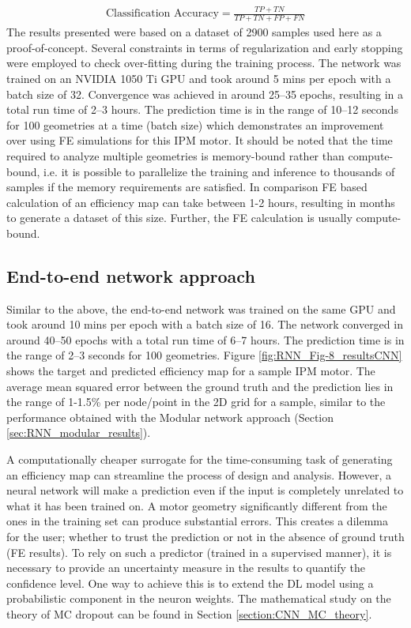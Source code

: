 \begin{align}
    \text{Classification Accuracy} = \frac{TP + TN}{TP + TN + FP + FN} \label{eqn:RNN_CA}
\end{align}
The results presented were based on a dataset of 2900 samples used here as a proof-of-concept. Several constraints in terms of regularization and early stopping \parencite{caruana2001overfitting} were employed to check over-fitting during the training process. The network was trained on an NVIDIA 1050 Ti GPU and took around 5 mins per epoch with a batch size of 32. Convergence was achieved in around 25–35 epochs, resulting in a total run time of 2–3 hours. The prediction time is in the range of 10–12 seconds for 100 geometries at a time (batch size) which demonstrates an improvement over using FE simulations for this IPM motor. It should be noted that the time required to analyze multiple geometries is memory-bound rather than compute-bound, i.e. it is possible to parallelize the training and inference to thousands of samples if the memory requirements are satisfied. In comparison FE based calculation of an efficiency map can take between 1-2 hours, resulting in months to generate a dataset of this size. Further, the FE calculation is usually compute-bound. 

\subsection{End-to-end network approach}

Similar to the above, the end-to-end network was trained on the same GPU and took around 10 mins per epoch with a batch size of 16. The network converged in around 40–50 epochs with a total run time of 6–7 hours. The prediction time is in the range of 2–3 seconds for 100 geometries. Figure \ref{fig:RNN_Fig-8_resultsCNN} shows the target and predicted efficiency map for a sample IPM motor. The average mean squared error between the ground truth and the prediction lies in the range of 1-1.5\% per node/point in the 2D grid for a sample, similar to the performance obtained with the Modular network approach (Section \ref{sec:RNN_modular_results}).

A computationally cheaper surrogate for the time-consuming task of generating an efficiency map can streamline the process of design and analysis. However, a neural network will make a prediction even if the input is completely unrelated to what it has been trained on. A motor geometry significantly different from the ones in the training set can produce substantial errors. This creates a dilemma for the user; whether to trust the prediction or not in the absence of ground truth (FE results). To rely on such a predictor (trained in a supervised manner), it is necessary to provide an uncertainty measure in the results to quantify the confidence level. One way to achieve this is to extend the DL model using a probabilistic component in the neuron weights. The mathematical study on the theory of MC dropout can be found in Section \ref{section:CNN_MC_theory}.

